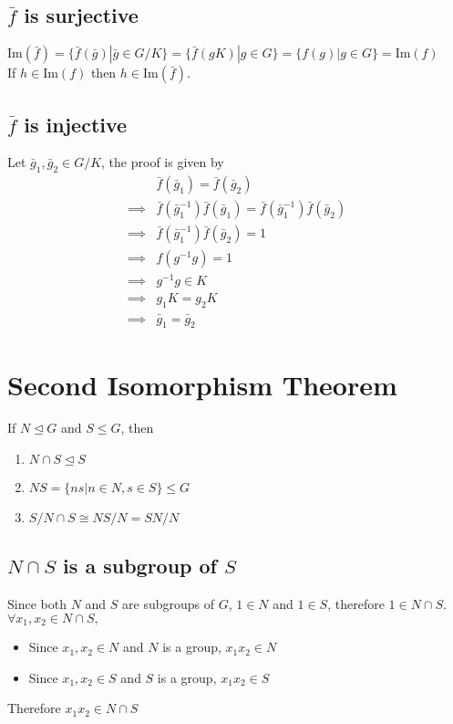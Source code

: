 \documentclass{article}
\renewcommand{\Im}{\text{Im}}
\begin{document}
	\subsection*{$\bar{f}$ is surjective}
	$\Im(\bar{f})=\{\bar{f}(\bar{g})|\bar{g}\in G/K\}=\{\bar{f}(gK)|g\in G\}=\{f(g)|g\in G\}=\Im(f)$\\
	If $h\in\Im(f)$ then $h\in\Im(\bar{f})$.
	\subsection*{$\bar{f}$ is injective}
	Let $\bar{g}_1,\bar{g}_2\in G/K$, the proof is given by \begin{align*}
		&\bar{f}(\bar{g}_1)=\bar{f}(\bar{g}_2) \\
		\implies &
		\bar{f}(\bar{g}_1^{-1})\bar{f}(\bar{g}_1)=\bar{f}(\bar{g}_1^{-1})\bar{f}(\bar{g}_2) \\
		\implies &
		\bar{f}(\bar{g}_1^{-1})\bar{f}(\bar{g}_2)=1\\
		\implies & f(g^{-1}g)=1\\
		\implies & g^{-1}g\in K\\
		\implies & g_1K=g_2K\\
		\implies & \bar{g}_1=\bar{g}_2
	\end{align*}
	
		\section*{Second Isomorphism Theorem}
	If $N\trianglelefteq G$ and $S\leq G$, then\begin{enumerate}
		\item $N\cap S\trianglelefteq S$
		\item $NS=\{ns|n\in N,s\in S\}\leq G$
		\item $S/N\cap S\cong NS/N=SN/N$
	\end{enumerate}
	\subsection*{$N\cap S$ is a subgroup of $S$}
	Since both $N$ and $S$ are subgroups of $G$, $1\in N$ and $1\in S$, therefore $1\in N\cap S$.\medskip\\
	$\forall x_1,x_2\in N\cap S,$\begin{itemize}
		\item Since $x_1,x_2\in N$ and $N$ is a group, $x_1x_2\in N$ 
		\item Since $x_1,x_2\in S$ and $S$ is a group, $x_1x_2\in S$ 
	\end{itemize}
	Therefore $x_1x_2\in N\cap S$
\end{document}
